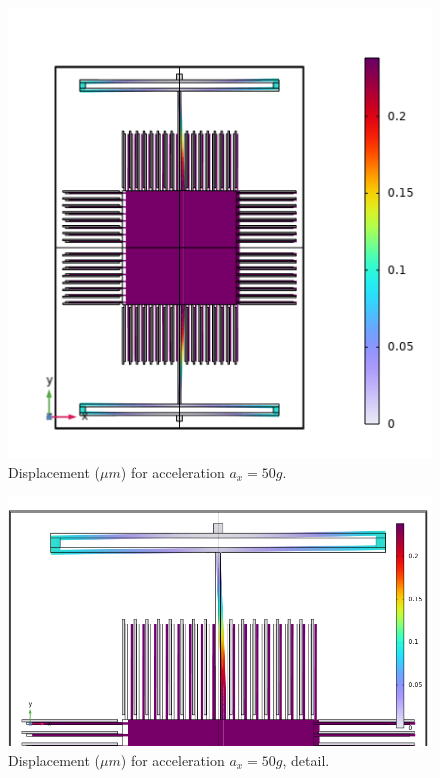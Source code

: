 \documentclass[lettersize,journal]{IEEEtran}
\begin{document}
    \begin{figure}[!h]
        \centering
        \includegraphics[width=1.0\linewidth]{displacement_ax}
        \caption{Displacement (\(\mu m\)) for acceleration \(a_x=50g\).}
        \label{fig:disp_ax}
    \end{figure}
    
    \begin{figure}[!h]
        \centering
        \includegraphics[width=1.0\linewidth]{displacement_ax_detail}
        \caption{Displacement (\(\mu m\)) for acceleration \(a_x=50g\), detail.}
        \label{fig:disp_ax_det}
    \end{figure}
    
\end{document}
